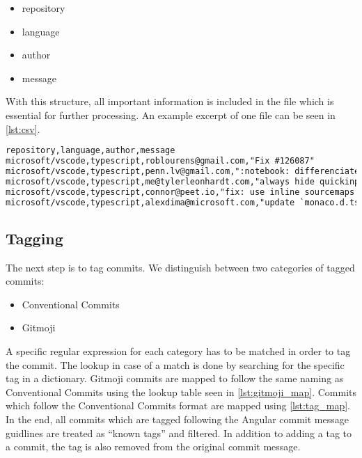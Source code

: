 \begin{itemize}
  \item repository
  \item language
  \item author
  \item message
\end{itemize}

With this structure, all important information is included in the file which is
essential for further processing. An example excerpt of one file can be seen in
\autoref{lst:csv}.

\begin{lstlisting}[language=xml, label={lst:csv}, caption={Excerpt of \texttt{typescript.csv} with commits from the repository \texttt{microsoft/vscode}}]
repository,language,author,message
microsoft/vscode,typescript,roblourens@gmail.com,"Fix #126087"
microsoft/vscode,typescript,penn.lv@gmail.com,":notebook: differenciate editor focus and list view focus"
microsoft/vscode,typescript,me@tylerleonhardt.com,"always hide quickinput on iPad when focus is lost fixes #125284"
microsoft/vscode,typescript,connor@peet.io,"fix: use inline sourcemaps in watch task"
microsoft/vscode,typescript,alexdima@microsoft.com,"update `monaco.d.ts`"
\end{lstlisting}

\subsection{Tagging}

The next step is to tag commits. We distinguish between two categories of tagged
commits:

\begin{itemize}
  \item Conventional Commits \cite{conventionalcommits}
  \item Gitmoji \cite{gitmoji}
\end{itemize}

A specific regular expression for each category has to be matched in order to
tag the commit. The lookup in case of a match is done by searching for the
specific tag in a dictionary. Gitmoji commits are mapped to follow the same naming
as Conventional Commits using the lookup table seen in \autoref{lst:gitmoji_map}.
Commits which follow the Conventional Commits format are mapped using \autoref{lst:tag_map}.
In the end, all commits which are tagged following the Angular commit message
guidlines \cite{angular_guidelines} are treated as “known tags” and filtered.
In addition to adding a tag to a commit, the tag is also removed from the original
commit message.

